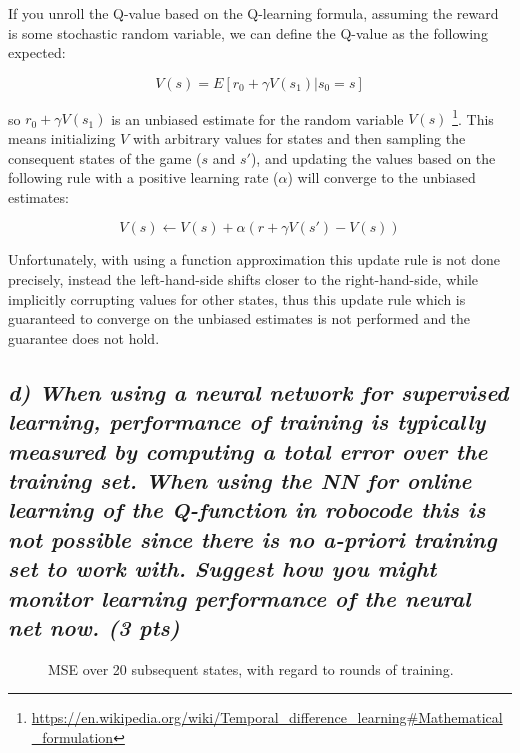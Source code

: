 \documentclass[a4paper,12pt]{article}
\begin{document}
If you unroll the Q-value based on the Q-learning formula, assuming the reward is some stochastic random variable, we can define the Q-value as the following expected:

$$V(s) = E[r_0 + \gamma V(s_1) | s_0 = s]$$

so $r_0 + \gamma V(s_1)$ is an unbiased estimate for the random variable $V(s)$ \footnote{\url{https://en.wikipedia.org/wiki/Temporal\_difference\_learning\#Mathematical\_formulation}}. This means initializing $V$ with arbitrary values for states and then sampling the consequent states of the game ($s$ and $s'$), and updating the values based on the following rule with a positive learning rate ($\alpha$) will converge to the unbiased estimates:

$$V(s) \leftarrow V(s) + \alpha (r + \gamma V(s') - V(s))$$


Unfortunately, with using a function approximation this update rule is not done precisely, instead the left-hand-side shifts closer to the right-hand-side, while implicitly corrupting values for other states, thus this update rule which is guaranteed to converge on the unbiased estimates is not performed and the guarantee does not hold. 

\pagebreak

\subsection*{\emph{d) When using a neural network for supervised learning, performance of training is typically measured by computing a total error over the training set. When using the NN for online learning of the Q-function in robocode this is not possible since there is no a-priori training set to work with. Suggest how you might monitor learning performance of the neural net now. (3 pts)}}

\begin{figure}[hbt!]
\caption{MSE over 20 subsequent states, with regard to rounds of training.}
\label{fig:nn_metric}
\end{figure}
\end{document}
